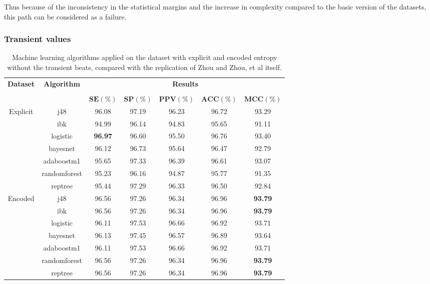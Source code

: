 Thus because of the inconsistency in the statistical margins and the increase in complexity compared to the basic version of the datasets, this path can be considered as a failure.

\subsubsection{Transient values}
\begin{table}[h]
\begin{center}
\begin{threeparttable}
\caption{Machine learning algorithms applied on the dataset with explicit and encoded entropy without the transient beats, compared with the replication of Zhou and Zhou, et al \cite[p. 7]{zhou2015} itself.}
\label{table:zhou_hr_and_unimol_126}
\scriptsize
  \begin{tabular}{c c c c c c c}
  \toprule
  \textbf{Dataset} & \textbf{Algorithm} & \multicolumn{5}{c}{\textbf{Results}} \\
  \cline{3-7}
  \\
  & & $\mathbf{SE(\%)}$ & $\mathbf{SP(\%)}$ & $\mathbf{PPV(\%)}$ & $\mathbf{ACC(\%)}$ & $\mathbf{MCC(\%)}$\\
  \midrule  
  Explicit & j48 & 96.08 & 97.19 & 96.23 & 96.72 & 93.29 \\
  & ibk & 94.99 & 96.14 & 94.83 & 95.65 & 91.11 \\
  & logistic & \textbf{96.97} & 96.60 & 95.50 & 96.76 & 93.40 \\
  & bayesnet & 96.12 & 96.73 & 95.64 & 96.47 & 92.79 \\
  & adaboostm1 & 95.65 & 97.33 & 96.39 & 96.61 & 93.07 \\
  & randomforest & 95.23 & 96.16 & 94.87 & 95.77 & 91.35 \\
  & reptree & 95.44 & 97.29 & 96.33 & 96.50 & 92.84 \\
  \hline
  Encoded & j48 & 96.56 & 97.26 & 96.34 & 96.96 & \textbf{93.79} \\
  & ibk & 96.56 & 97.26 & 96.34 & 96.96 & \textbf{93.79} \\
  & logistic & 96.11 & 97.53 & 96.66 & 96.92 & 93.71 \\
  & bayesnet & 96.13 & 97.45 & 96.57 & 96.89 & 93.64 \\
  & adaboostm1 & 96.11 & 97.53 & 96.66 & 96.92 & 93.71 \\
  & randomforest & 96.56 & 97.26 & 96.34 & 96.96 & \textbf{93.79} \\
  & reptree & 96.56 & 97.26 & 96.34 & 96.96 & \textbf{93.79} \\

\end{tabular}
\end{threeparttable}
\end{center}
\end{table}
